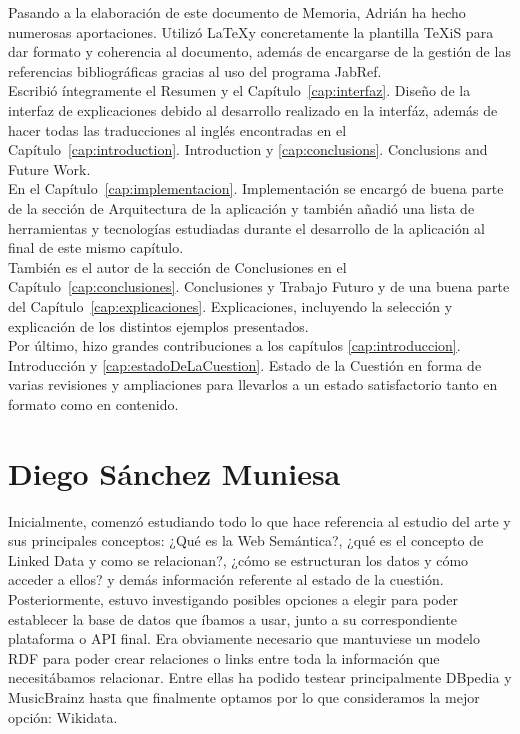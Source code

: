 Pasando a la elaboración de este documento de Memoria, Adrián ha hecho numerosas aportaciones. Utilizó \LaTeX y concretamente la plantilla TeXiS para dar formato y coherencia al documento, además de encargarse de la gestión de las referencias bibliográficas gracias al uso del programa JabRef. \\

Escribió íntegramente el Resumen y el Capítulo~\ref{cap:interfaz}. Diseño de la interfaz de explicaciones debido al desarrollo realizado en la interfáz, además de hacer todas las traducciones al inglés encontradas en el Capítulo~\ref{cap:introduction}. Introduction y \ref{cap:conclusions}. Conclusions and Future Work. \\


En el Capítulo~\ref{cap:implementacion}. Implementación se encargó de buena parte de la sección de Arquitectura de la aplicación y  también añadió una lista de herramientas y tecnologías estudiadas durante el desarrollo de la aplicación al final de este mismo capítulo. \\

También es el autor de la sección de Conclusiones en el Capítulo~\ref{cap:conclusiones}. Conclusiones y Trabajo Futuro y de una buena parte del Capítulo~\ref{cap:explicaciones}. Explicaciones, incluyendo la selección y explicación de los distintos ejemplos presentados. \\

Por último, hizo grandes contribuciones a los capítulos \ref{cap:introduccion}. Introducción y \ref{cap:estadoDeLaCuestion}. Estado de la Cuestión en forma de varias revisiones y ampliaciones para llevarlos a un estado satisfactorio tanto en formato como en contenido. \\


\section{Diego Sánchez Muniesa}

Inicialmente, comenzó estudiando todo lo que hace referencia al estudio del arte y sus principales conceptos: ¿Qué es la Web Semántica?, ¿qué es el concepto de Linked Data y como se relacionan?, ¿cómo se estructuran los datos y cómo acceder a ellos? y demás información referente al estado de la cuestión.\\

Posteriormente, estuvo investigando posibles opciones a elegir para poder establecer la base de datos que íbamos a usar, junto a su correspondiente plataforma o API final. Era obviamente necesario que mantuviese un modelo RDF para poder crear relaciones o links entre toda la información que necesitábamos relacionar. Entre ellas ha podido testear principalmente DBpedia y MusicBrainz hasta que finalmente optamos por lo que consideramos la mejor opción: Wikidata.\\

